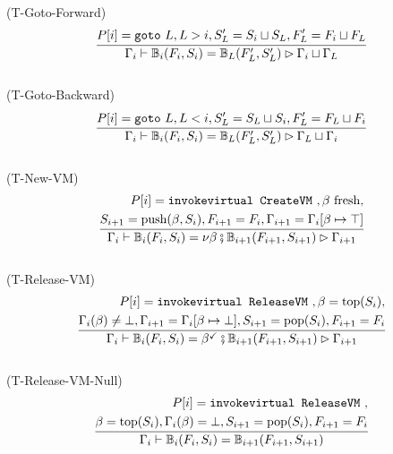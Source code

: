 \documentclass{amsart}
\newcommand{\bB}{\mathbb{B}}
\numberwithin{equation}{section}
\theoremstyle{plain} %
\theoremstyle{definition}
\theoremstyle{remark}
\begin{document}
\\
(T-Goto-Forward)
\begin{equation*}
\frac{\begin{aligned}P[i] = \text{\texttt{goto} $L$}, L > i, S'_{L} =  S_i \sqcup S_L, F'_L = F_i \sqcup F_L
\end{aligned}}
{\Gamma_i \vdash \bB{}_i(F_i, S_i) = \bB{}_{L}(F'_L, S'_L) \rhd \Gamma_i \sqcup \Gamma_L}
\end{equation*}
\\
(T-Goto-Backward)
\begin{equation*}
\frac{\begin{aligned}P[i] = \text{\texttt{goto} $L$}, L < i, S'_{L} =  S_L \sqcup S_i, F'_L = F_L \sqcup F_i
\end{aligned}}
{\Gamma_i \vdash \bB{}_i(F_i, S_i) = \bB{}_{L}(F'_L, S'_L) \rhd \Gamma_L \sqcup \Gamma_i}
\end{equation*}
\\
(T-New-VM)
\begin{equation*}\frac{\begin{aligned}
P[i] = \text{\texttt{invokevirtual CreateVM} }, \beta \text{ fresh},\\
S_{i+1} = \text{push}(\beta,S_i), F_{i+1} = F_i, \Gamma_{i+1} = \Gamma_i[\beta \mapsto \top]
\end{aligned}}
{\Gamma_i \vdash \bB{}_i(F_i, S_i) = \nu \beta \fatsemi \bB{}_{i+1}(F_{i+1}, S_{i+1}) \rhd \Gamma_{i+1}}
\end{equation*}
\\
(T-Release-VM)
\begin{equation*}
\frac{\begin{aligned}P[i] = \text{\texttt{invokevirtual ReleaseVM} }, \beta = \text{top}(S_i),\\
\Gamma_i(\beta) \neq \bot, \Gamma_{i+1} = \Gamma_i[\beta \mapsto \bot],
S_{i+1} = \text{pop}(S_i), F_{i+1} = F_i
\end{aligned}}
{\Gamma_i \vdash \bB{}_i(F_i, S_i) = \beta^{\checkmark} \fatsemi \bB{}_{i+1}(F_{i+1}, S_{i+1}) \rhd \Gamma_{i+1}}
\end{equation*}
\\
(T-Release-VM-Null)
\begin{equation*}
\frac{\begin{aligned}P[i] = \text{\texttt{invokevirtual ReleaseVM} },\\
\beta = \text{top}(S_i), \Gamma_i(\beta) = \bot, S_{i+1} = \text{pop}(S_i), F_{i+1} = F_i
\end{aligned}}
{\Gamma_i \vdash \bB{}_i(F_i, S_i) = \bB{}_{i+1}(F_{i+1}, S_{i+1})}
\end{equation*}
\end{document}
